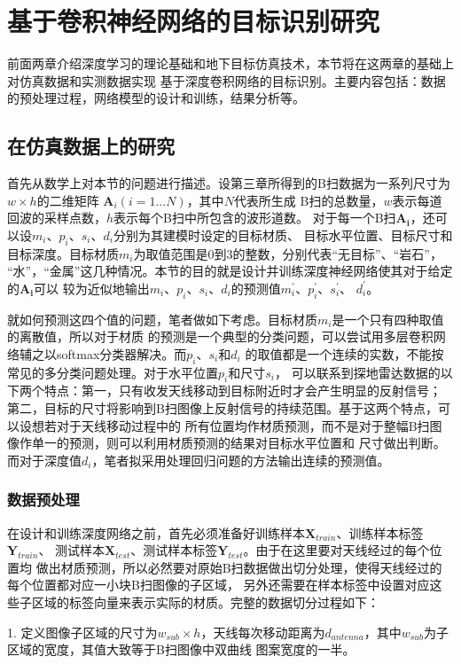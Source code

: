 \chapter{基于卷积神经网络的目标识别研究}
前面两章介绍深度学习的理论基础和地下目标仿真技术，本节将在这两章的基础上对仿真数据和实测数据实现
基于深度卷积网络的目标识别。主要内容包括：数据的预处理过程，网络模型的设计和训练，结果分析等。
\section{在仿真数据上的研究}
首先从数学上对本节的问题进行描述。设第三章所得到的B扫数据为一系列尺寸为$w\times h$的二维矩阵
$\mathbf{A}_i(i = 1...N)$，其中$N$代表所生成
B扫的总数量，$w$表示每道回波的采样点数，$h$表示每个B扫中所包含的波形道数。
对于每一个B扫$\mathbf{A_i}$，还可以设$m_i$、$p_i$、$s_i$、$d_i$分别为其建模时设定的目标材质、
目标水平位置、目标尺寸和目标深度。目标材质$m_i$为取值范围是0到3的整数，分别代表“无目标”、“岩石”，
“水”，“金属”这几种情况。本节的目的就是设计并训练深度神经网络使其对于给定的$\mathbf{A_i}$可以
较为近似地输出$m_i$、$p_i$、$s_i$、$d_i$的预测值$m_i^{\prime}$、$p_i^{\prime}$、$s_i^{\prime}$、
$d_i^{\prime}$。

就如何预测这四个值的问题，笔者做如下考虑。目标材质$m_i$是一个只有四种取值的离散值，所以对于材质
的预测是一个典型的分类问题，可以尝试用多层卷积网络辅之以softmax分类器解决。而$p_i$、$s_i$和$d_i$
的取值都是一个连续的实数，不能按常见的多分类问题处理。对于水平位置$p_i$和尺寸$s_i$，
可以联系到探地雷达数据的以下两个特点：第一，只有收发天线移动到目标附近时才会产生明显的反射信号；
第二，目标的尺寸将影响到B扫图像上反射信号的持续范围。基于这两个特点，可以设想若对于天线移动过程中的
所有位置均作材质预测，而不是对于整幅B扫图像作单一的预测，则可以利用材质预测的结果对目标水平位置和
尺寸做出判断。而对于深度值$d_i$，笔者拟采用处理回归问题的方法输出连续的预测值。
\subsection{数据预处理}
在设计和训练深度网络之前，首先必须准备好训练样本$\mathbf{X}_{train}$、训练样本标签$\mathbf{Y}_{train}$、
测试样本$\mathbf{X}_{test}$、测试样本标签$\mathbf{Y}_{test}$。由于在这里要对天线经过的每个位置均
做出材质预测，所以必然要对原始B扫数据做出切分处理，使得天线经过的每个位置都对应一小块B扫图像的子区域，
另外还需要在样本标签中设置对应这些子区域的标签向量来表示实际的材质。完整的数据切分过程如下：

1. 定义图像子区域的尺寸为$w_{sub}\times h$，天线每次移动距离为$d_{antenna}$，其中$w_{sub}$为子区域的宽度，其值大致等于B扫图像中双曲线
图案宽度的一半。

